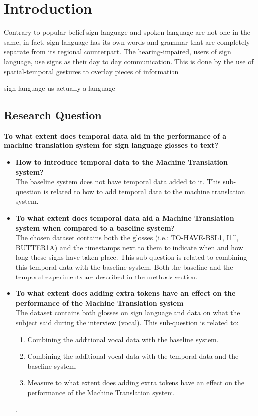 \section{Introduction}

Contrary to popular belief sign language and spoken language are not one in the same, in fact, sign language has its own words and grammar \cite{camgoz2018neural} that are completely separate from its regional counterpart. The hearing-impaired, users of sign language, use signs as their day to day communication. This is done by the use of spatial-temporal gestures to overlay pieces of information

\cite{stokoe2005sign}
sign language us actually a language


\subsection{Research Question}

\textbf{To what extent does temporal data aid in the performance of a machine translation system for sign language glosses to text?}

\begin{itemize}
    \item \textbf{How to introduce temporal data to the Machine Translation system?} \\
    The baseline system does not have temporal data added to it. This sub-question is related to how to add temporal data to the machine translation system.
    \item \textbf{To what extent does temporal data aid a Machine Translation system when compared to a baseline system?} \\
    The chosen dataset \cite{dgscorpus_3} contains both the glosses (i.e.: TO-HAVE-BSL1, I1\textasciicircum, BUTTER1A) and the timestamps next to them to indicate when and how long these signs have taken place. This sub-question is related to combining this temporal data with the baseline system. Both the baseline and the temporal experiments are described in the methods section.
    \item \textbf{To what extent does adding extra tokens have an effect on the performance of the Machine Translation system} \\
    The dataset contains both glosses on sign language and data on what the subject said during the interview (vocal). This sub-question is related to:
    \begin{enumerate}
        \item Combining the additional vocal data with the baseline system.
        \item Combining the additional vocal data with the temporal data and the baseline system.
        \item Measure to what extent does adding extra tokens have an effect on the performance of the Machine Translation system.
    \end{enumerate}.
\end{itemize}

